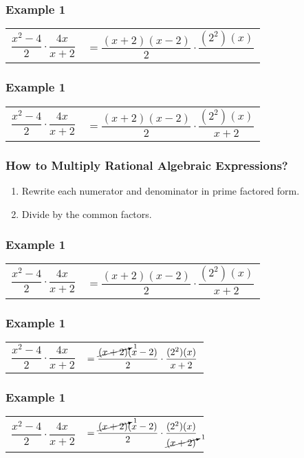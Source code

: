 \documentclass[14pt]{beamer}
\begin{document}
   \begin{frame}
   	\frametitle{Example 1}
   	\begin{tabular}{ll}
   		$\dfrac{x^2 - 4}{2} \cdot \dfrac{4x}{x + 2}$ & $ = \dfrac{(x  + 2 ) ( x  -  2)}{2} \cdot \dfrac{(2^2)(x)}{\phantom{x + 2}}$ \\
   	\end{tabular}
   \end{frame}

     \begin{frame}
    	\frametitle{Example 1}
    	\begin{tabular}{ll}
    		$\dfrac{x^2 - 4}{2} \cdot \dfrac{4x}{x + 2}$ & $ = \dfrac{(x  + 2 ) ( x  -  2)}{2} \cdot \dfrac{(2^2)(x)}{x + 2}$ \\
    	\end{tabular}
    \end{frame}

    \begin{frame}
    	\frametitle{How to Multiply Rational Algebraic Expressions?}
    	\begin{enumerate}
    		\item Rewrite each numerator and denominator in prime factored form.
    		\item Divide by the common factors.
    	\end{enumerate}
    \end{frame}

    \begin{frame}
    	\frametitle{Example 1}
    	\begin{tabular}{ll}
    		$\dfrac{x^2 - 4}{2} \cdot \dfrac{4x}{x + 2}$ & $ = \dfrac{(x  + 2 ) ( x  -  2)}{2} \cdot \dfrac{(2^2)(x)}{x + 2}$ \\
    	\end{tabular}
    \end{frame}

    \begin{frame}
    	\frametitle{Example 1}
    	\begin{tabular}{ll}
    		$\dfrac{x^2 - 4}{2} \cdot \dfrac{4x}{x + 2}$ & $ = \dfrac{\cancelto{1}{(x  + 2 )} ( x  -  2)}{2} \cdot \dfrac{(2^2)(x)}{x + 2}$ \\
    	\end{tabular}
    \end{frame}


\begin{frame}
	\frametitle{Example 1}
	\begin{tabular}{ll}
		$\dfrac{x^2 - 4}{2} \cdot \dfrac{4x}{x + 2}$ & $ = \dfrac{\cancelto{1}{(x  + 2 )} ( x  -  2)}{2} \cdot \dfrac{(2^2)(x)}{\cancelto{1}{(x  + 2 )}}$ \\
	\end{tabular}
\end{frame}
\end{document}
